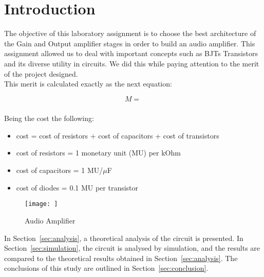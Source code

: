 \newpage
\section{Introduction}
\label{sec:introduction}

The objective of this laboratory assignment is to choose the best architecture of the Gain and Output amplifier
stages in order to build an audio amplifier. This assignment allowed us to deal with important concepts such as BJTs Transistors and its diverse utility in circuits. We did this while paying attention to the merit of the project designed.\\
This merit is calculated exactly as the next equation:

\begin{equation} 
M = \frac{}{}
\label{}
\end{equation}

Being the cost the following:
\begin{itemize}
	\item cost = cost of resistors  + cost of capacitors + cost of transistors
	\item cost of resistors = 1 monetary unit (MU) per kOhm
	\item cost of capacitors = 1 MU/$\mu$F
	\item cost of diodes = 0.1 MU per transistor
	
\end{itemize}

\begin{figure}[H] 
\centering
\texttt{[image: ]} 
\caption{Audio Amplifier}
\label{first}
\end{figure}

In Section~\ref{sec:analysis}, a theoretical analysis of the circuit is
presented. In Section~\ref{sec:simulation}, the circuit is analysed by
simulation, and the results are compared to the theoretical results obtained in
Section~\ref{sec:analysis}. The conclusions of this study are outlined in
Section~\ref{sec:conclusion}. \\


